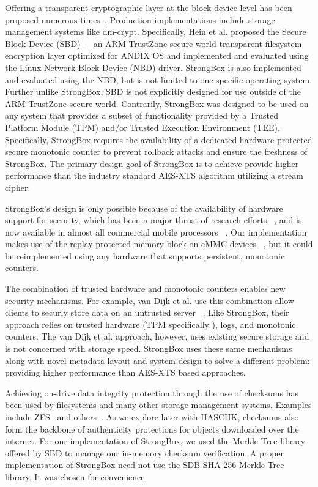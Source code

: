 Offering a transparent cryptographic layer at the block device level has been
proposed numerous times~\cite{SBD}. Production implementations include storage
management systems like dm-crypt. Specifically, Hein et al. proposed the Secure
Block Device (SBD)~\cite{SBD}---an ARM TrustZone secure world transparent
filesystem encryption layer optimized for ANDIX OS and implemented and evaluated
using the Linux Network Block Device (NBD) driver. StrongBox is also implemented
and evaluated using the NBD, but is not limited to one specific operating
system. Further unlike StrongBox, SBD is not explicitly designed for use outside
of the ARM TrustZone secure world. Contrarily, StrongBox was designed to be used
on any system that provides a subset of functionality provided by a Trusted
Platform Module (TPM) and/or Trusted Execution Environment (TEE). Specifically,
StrongBox requires the availability of a dedicated hardware protected secure
monotonic counter to prevent rollback attacks and ensure the freshness of
StrongBox. The primary design goal of StrongBox is to achieve provide higher
performance than the industry standard AES-XTS algorithm utilizing a stream
cipher.

StrongBox's design is only possible because of the availability of hardware
support for security, which has been a major thrust of research efforts
~\cite{asplos1,asplos2,asplos3,asplos4,isca1,isca2}, and is now available in
almost all commercial mobile processors ~\cite{TPM,TEE,RPMB,Kirovski}. Our
implementation makes use of the replay protected memory block on eMMC devices
~\cite{eMMC-standard,RPMB}, but it could be reimplemented using any hardware
that supports persistent, monotonic counters.

The combination of trusted hardware and monotonic counters enables new security
mechanisms. For example, van Dijk et al. use this combination allow clients to
securly store data on an untrusted server ~\cite{CSAIL-TPM}. Like StrongBox,
their approach relies on trusted hardware (TPM specifically \cite{TPM}), logs,
and monotonic counters. The van Dijk et al. approach, however, uses existing
secure storage and is not concerned with storage speed. StrongBox uses these
same mechanisms along with novel metadata layout and system design to solve a
different problem: providing higher performance than AES-XTS based approaches.

Achieving on-drive data integrity protection through the use of checksums has
been used by filesystems and many other storage management systems. Examples
include ZFS~\cite{ZFS} and others~\cite{SBD}. As we explore later with HASCHK,
checksums also form the backbone of authenticity protections for objects
downloaded over the internet. For our implementation of StrongBox, we used the
Merkle Tree library offered by SBD to manage our in-memory checksum
verification. A proper implementation of StrongBox need not use the SDB SHA-256
Merkle Tree library. It was chosen for convenience.

